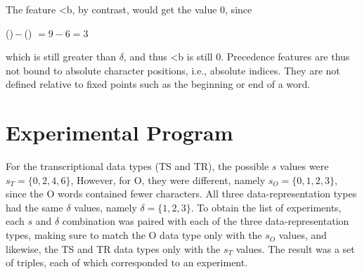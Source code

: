 The feature \textsf{<b}, by contrast, would get the value $0$, since 
\begin{center}
()\,$ - $\,()\,\,$ = 9 - 6 = 3$
\end{center}
which is still greater than $\delta$, and thus \textsf{<b} is still $0$.
%
Precedence features are thus not bound to absolute character positions, i.e., 
absolute indices. They are not defined relative to fixed points such as 
the beginning or end of a word.

\section{Experimental Program}


For the transcriptional data types (TS and TR), the possible $s$ values were $s_T = \{0,2,4,6\}$, However, for O, they were different, namely $s_O = \{0,1,2,3\}$, since the O words contained fewer characters. All three data-representation types had the  same $\delta$ values, namely $\delta = \{1,2,3\}$. %
To obtain the list of experiments, each $s$ and $\delta$ combination was paired with each of the three data-representation types, making sure to match the O data type only with the $s_O$ values, and likewise, the TS and TR data types only with the $s_T$ values. The result was a set of triples, each of which corresponded to an experiment. 

